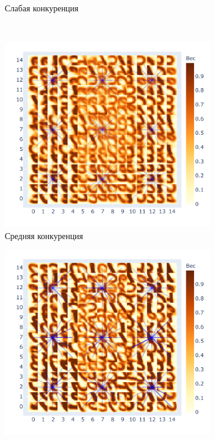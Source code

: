 \documentclass[a4paper]{article}
\begin{document}
\begin{figure}[H]
\begin{subfigure}{0.45\textwidth}
    \caption{Слабая конкуренция}
\end{subfigure}
\\
\begin{subfigure}{0.45\textwidth}
    \includegraphics[width=\textwidth,keepaspectratio=true]{competition_on_XY_medium_good_ru.pdf}
    \caption{Средняя конкуренция} 
\end{subfigure}
\begin{subfigure}{0.45\textwidth}
    \includegraphics[width=\textwidth,keepaspectratio=true]{competition_on_XY_best_ru.pdf}

\end{subfigure}
\end{figure}
\end{document}
